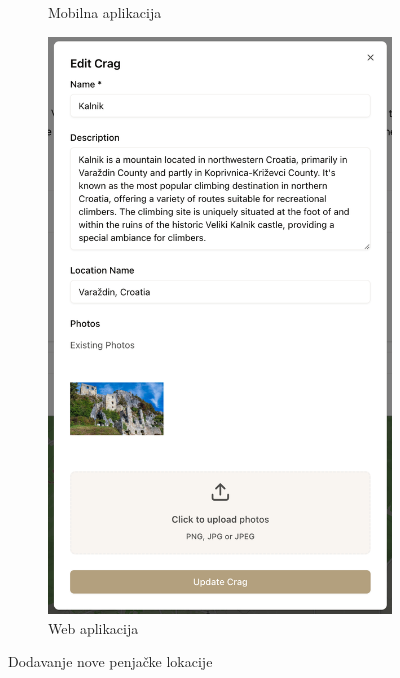 \begin{figure}[H]
\begin{subfigure}[b]{0.36\textwidth}
        \caption{Mobilna aplikacija}
        \label{fig:dodavanje_lokacije_mob}
    \end{subfigure}
    \hfill
    \begin{subfigure}[b]{0.47\textwidth}
        \centering
        \includegraphics[width=\textwidth]{images/implementacija/web/editing-options/edit-crag.png}
        \caption{Web aplikacija}
        \label{fig:dodavanje_lokacije_web}
    \end{subfigure}
    \caption{Dodavanje nove penjačke lokacije}
    \label{fig:dodavanje_lokacije}
\end{figure}

